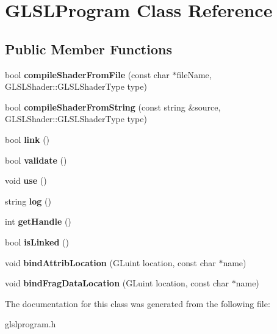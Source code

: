 \hypertarget{classGLSLProgram}{\section{G\-L\-S\-L\-Program Class Reference}
\label{classGLSLProgram}
}
\subsection*{Public Member Functions}
\begin{DoxyCompactItemize}
\item 
\hypertarget{classGLSLProgram_a31f24024046d5ed7646d0c53df4898dc}{bool {\bfseries compile\-Shader\-From\-File} (const char $\ast$file\-Name, G\-L\-S\-L\-Shader\-::\-G\-L\-S\-L\-Shader\-Type type)}\label{classGLSLProgram_a31f24024046d5ed7646d0c53df4898dc}

\item 
\hypertarget{classGLSLProgram_a428c7ce6d50b7100d06c621e6647dda8}{bool {\bfseries compile\-Shader\-From\-String} (const string \&source, G\-L\-S\-L\-Shader\-::\-G\-L\-S\-L\-Shader\-Type type)}\label{classGLSLProgram_a428c7ce6d50b7100d06c621e6647dda8}

\item 
\hypertarget{classGLSLProgram_a79c92c1c9a1a09c0a091cd52a8f602c6}{bool {\bfseries link} ()}\label{classGLSLProgram_a79c92c1c9a1a09c0a091cd52a8f602c6}

\item 
\hypertarget{classGLSLProgram_af6fecc60f168b423e402cc68aecf8ce3}{bool {\bfseries validate} ()}\label{classGLSLProgram_af6fecc60f168b423e402cc68aecf8ce3}

\item 
\hypertarget{classGLSLProgram_a0ea2aeacb4361b37f145246430134bb6}{void {\bfseries use} ()}\label{classGLSLProgram_a0ea2aeacb4361b37f145246430134bb6}

\item 
\hypertarget{classGLSLProgram_ac03cbf803fbcc60d3ff4b3b6d4ecbaa6}{string {\bfseries log} ()}\label{classGLSLProgram_ac03cbf803fbcc60d3ff4b3b6d4ecbaa6}

\item 
\hypertarget{classGLSLProgram_aa630d9d45c1fc992aac91a7d1eb92e08}{int {\bfseries get\-Handle} ()}\label{classGLSLProgram_aa630d9d45c1fc992aac91a7d1eb92e08}

\item 
\hypertarget{classGLSLProgram_ad0d1efa38db415e35d9a329a93828815}{bool {\bfseries is\-Linked} ()}\label{classGLSLProgram_ad0d1efa38db415e35d9a329a93828815}

\item 
\hypertarget{classGLSLProgram_a54589ae245f6fac51f79a6617c91240b}{void {\bfseries bind\-Attrib\-Location} (G\-Luint location, const char $\ast$name)}\label{classGLSLProgram_a54589ae245f6fac51f79a6617c91240b}

\item 
\hypertarget{classGLSLProgram_a44270f942de121ef2493e26f1226a902}{void {\bfseries bind\-Frag\-Data\-Location} (G\-Luint location, const char $\ast$name)}\label{classGLSLProgram_a44270f942de121ef2493e26f1226a902}

\end{DoxyCompactItemize}


The documentation for this class was generated from the following file\-:\begin{DoxyCompactItemize}
\item 
glslprogram.\-h\end{DoxyCompactItemize}
